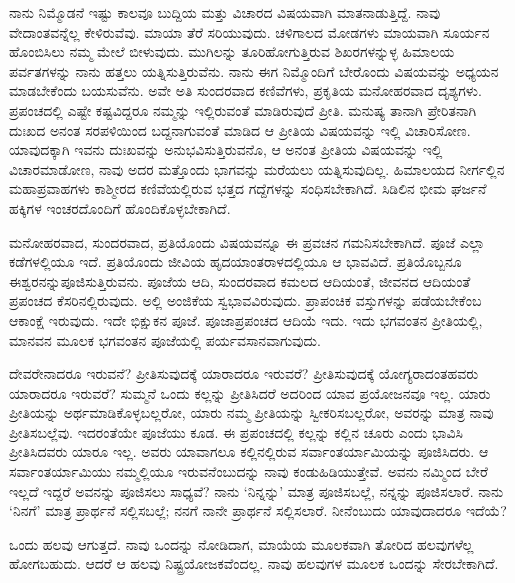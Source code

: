 ನಾನು ನಿಮ್ಮೊಡನೆ ಇಷ್ಟು ಕಾಲವೂ ಬುದ್ದಿಯ ಮತ್ತು ವಿಚಾರದ ವಿಷಯವಾಗಿ ಮಾತನಾಡುತ್ತಿದ್ದೆ. ನಾವು ವೇದಾಂತವನ್ನೆಲ್ಲ ಕೇಳಿರುವೆವು. ಮಾಯಾ ತೆರೆ ಸರಿಯುವುದು. ಚಳಿಗಾಲದ ಮೋಡಗಳು ಮಾಯವಾಗಿ ಸೂರ್ಯನ ಹೊಂಬಿಸಿಲು ನಮ್ಮ ಮೇಲೆ ಬೀಳುವುದು. ಮುಗಿಲನ್ನು ತೂರಿಹೋಗುತ್ತಿರುವ ಶಿಖರಗಳನ್ನುಳ್ಳ ಹಿಮಾಲಯ ಪರ್ವತಗಳನ್ನು ನಾನು ಹತ್ತಲು ಯತ್ನಿಸುತ್ತಿರುವೆನು. ನಾನು ಈಗ ನಿಮ್ಮೊಂದಿಗೆ ಬೇರೊಂದು ವಿಷಯವನ್ನು ಅಧ್ಯಯನ ಮಾಡಬೇಕೆಂದು ಬಯಸುವೆನು. ಅವೇ ಅತಿ ಸುಂದರವಾದ ಕಣಿವೆಗಳು, ಪ್ರಕೃತಿಯ ಮನೋಹರವಾದ ದೃಶ್ಯಗಳು. ಪ್ರಪಂಚದಲ್ಲಿ ಎಷ್ಟೇ ಕಷ್ಟವಿದ್ದರೂ ನಮ್ಮನ್ನು ಇಲ್ಲಿರುವಂತೆ ಮಾಡಿರುವುದೆ ಪ್ರೀತಿ. ಮನುಷ್ಯ ತಾನಾಗಿ ಪ್ರೇರಿತನಾಗಿ ದುಃಖದ ಅನಂತ ಸರಪಳಿಯಿಂದ ಬದ್ದನಾಗುವಂತೆ ಮಾಡಿದ ಆ ಪ್ರೀತಿಯ ವಿಷಯವನ್ನು ಇಲ್ಲಿ ವಿಚಾರಿಸೋಣ. ಯಾವುದಕ್ಕಾಗಿ ಇವನು ದುಃಖವನ್ನು ಅನುಭವಿಸುತ್ತಿರುವನೊ, ಆ ಅನಂತ ಪ್ರೀತಿಯ ವಿಷಯವನ್ನು ಇಲ್ಲಿ ವಿಚಾರಮಾಡೋಣ, ನಾವು ಅದರ ಮತ್ತೊಂದು ಭಾಗವನ್ನು ಮರೆಯಲು ಯತ್ನಿಸುವುದಿಲ್ಲ. ಹಿಮಾಲಯದ ನೀರ್ಗಲ್ಲಿನ ಮಹಾಪ್ರವಾಹಗಳು ಕಾಶ್ಮೀರದ ಕಣಿವೆಯಲ್ಲಿರುವ ಭತ್ತದ ಗದ್ದೆಗಳನ್ನು ಸಂಧಿಸಬೇಕಾಗಿದೆ. ಸಿಡಿಲಿನ ಭೀಮ ಘರ್ಜನೆ ಹಕ್ಕಿಗಳ ಇಂಚರದೊಂದಿಗೆ ಹೊಂದಿಕೊಳ್ಳಬೇಕಾಗಿದೆ.

ಮನೋಹರವಾದ, ಸುಂದರವಾದ, ಪ್ರತಿಯೊಂದು ವಿಷಯವನ್ನೂ ಈ ಪ್ರವಚನ ಗಮನಿಸಬೇಕಾಗಿದೆ. ಪೂಜೆ ಎಲ್ಲಾ ಕಡೆಗಳಲ್ಲಿಯೂ ಇದೆ. ಪ್ರತಿಯೊಂದು ಜೀವಿಯ ಹೃದಯಾಂತರಾಳದಲ್ಲಿಯೂ ಆ ಭಾವವಿದೆ. ಪ್ರತಿಯೊಬ್ಬನೂ ಈಶ್ವರನನ್ನು\break ಪೂಜಿಸುತ್ತಿರುವನು. ಪೂಜೆಯ ಆದಿ, ಸುಂದರವಾದ ಕಮಲದ ಆದಿಯಂತೆ, ಜೀವನದ ಆದಿಯಂತೆ ಪ್ರಪಂಚದ ಕೆಸರಿನಲ್ಲಿರುವುದು. ಅಲ್ಲಿ ಅಂಜಿಕೆಯ ಸ್ವಭಾವವಿರುವುದು. ಪ್ರಾಪಂಚಿಕ ವಸ್ತುಗಳನ್ನು ಪಡೆಯಬೇಕೆಂಬ ಆಕಾಂಕ್ಷೆ ಇರುವುದು. ಇದೇ ಭಿಕ್ಷುಕನ ಪೂಜೆ. ಪೂಜಾಪ್ರಪಂಚದ ಆದಿಯೆ ಇದು. ಇದು ಭಗವಂತನ ಪ್ರೀತಿಯಲ್ಲಿ, ಮಾನವನ ಮೂಲಕ ಭಗವಂತನ ಪೂಜೆಯಲ್ಲಿ ಪರ್ಯವಸಾನವಾಗುವುದು.

ದೇವರೇನಾದರೂ ಇರುವನೆ? ಪ್ರೀತಿಸುವುದಕ್ಕೆ ಯಾರಾದರೂ ಇರುವರೆ? ಪ್ರೀತಿಸುವುದಕ್ಕೆ ಯೋಗ್ಯರಾದಂತಹವರು ಯಾರಾದರೂ ಇರುವರೆ? ಸುಮ್ಮನೆ ಒಂದು ಕಲ್ಲನ್ನು ಪ್ರೀತಿಸಿದರೆ ಅದರಿಂದ ಯಾವ ಪ್ರಯೋಜನವೂ ಇಲ್ಲ. ಯಾರು ಪ್ರೀತಿಯನ್ನು ಅರ್ಥಮಾಡಿಕೊಳ್ಳಬಲ್ಲರೋ, ಯಾರು ನಮ್ಮ ಪ್ರೀತಿಯನ್ನು ಸ್ವೀಕರಿಸಬಲ್ಲರೋ, ಅವರನ್ನು ಮಾತ್ರ ನಾವು ಪ್ರೀತಿಸಬಲ್ಲೆವು. ಇದರಂತೆಯೇ ಪೂಜೆಯು ಕೂಡ. ಈ ಪ್ರಪಂಚದಲ್ಲಿ ಕಲ್ಲನ್ನು ಕಲ್ಲಿನ ಚೂರು ಎಂದು ಭಾವಿಸಿ ಪ್ರೀತಿಸಿದವರು ಯಾರೂ ಇಲ್ಲ. ಅವರು ಯಾವಾಗಲೂ ಕಲ್ಲಿನಲ್ಲಿರುವ ಸರ್ವಾಂತರ್ಯಾಮಿಯನ್ನು ಪೂಜಿಸಿದರು. ಆ ಸರ್ವಾಂತರ್ಯಾಮಿಯು ನಮ್ಮಲ್ಲಿಯೂ ಇರುವನೆಂಬುದನ್ನು ನಾವು ಕಂಡುಹಿಡಿಯುತ್ತೇವೆ. ಅವನು ನಮ್ಮಿಂದ ಬೇರೆ ಇಲ್ಲದೆ ಇದ್ದರೆ ಅವನನ್ನು ಪೂಜಿಸಲು ಸಾಧ್ಯವೆ? ನಾನು `ನಿನ್ನನ್ನು' ಮಾತ್ರ ಪೂಜಿಸಬಲ್ಲೆ, ನನ್ನನ್ನು ಪೂಜಿಸಲಾರೆ. ನಾನು `ನಿನಗೆ' ಮಾತ್ರ ಪ್ರಾರ್ಥನೆ ಸಲ್ಲಿಸಬಲ್ಲೆ; ನನಗೆ ನಾನೇ ಪ್ರಾರ್ಥನೆ ಸಲ್ಲಿಸಲಾರೆ. ನೀನೆಂಬುದು ಯಾವುದಾದರೂ ಇದೆಯೆ?

ಒಂದು ಹಲವು ಆಗುತ್ತದೆ. ನಾವು ಒಂದನ್ನು ನೋಡಿದಾಗ, ಮಾಯೆಯ ಮೂಲಕವಾಗಿ ತೋರಿದ ಹಲವುಗಳೆಲ್ಲ ಹೋಗಬಹುದು. ಆದರೆ ಆ ಹಲವು ನಿಷ್ಟ್ರಯೋಜಕವೆಂದಲ್ಲ. ನಾವು ಹಲವುಗಳ ಮೂಲಕ ಒಂದನ್ನು ಸೇರಬೇಕಾಗಿದೆ.

